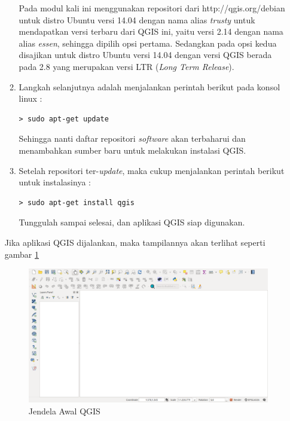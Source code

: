 \begin{enumerate}[A.]
\begin{enumerate}[1.]
Pada modul kali ini menggunakan repositori dari http://qgis.org/debian untuk distro Ubuntu versi 14.04 dengan nama alias \textit{trusty} untuk mendapatkan versi terbaru dari QGIS ini, yaitu versi 2.14 dengan nama alias \textit{essen}, sehingga dipilih opsi pertama. Sedangkan pada opsi kedua disajikan untuk distro Ubuntu versi 14.04 dengan versi QGIS berada pada 2.8 yang merupakan versi LTR (\textit{Long Term Release}).

\item Langkah selanjutnya adalah menjalankan perintah berikut pada konsol linux :

\begin{verbatim}
> sudo apt-get update
\end{verbatim}

Sehingga nanti daftar repositori \textit{software} akan terbaharui dan menambahkan sumber baru untuk melakukan instalasi QGIS.

\item Setelah repositori ter-\textit{update}, maka cukup menjalankan perintah berikut untuk instalasinya :

\begin{verbatim}
> sudo apt-get install qgis
\end{verbatim}

Tunggulah sampai selesai, dan aplikasi QGIS siap digunakan. 
\end{enumerate}

Jika aplikasi QGIS dijalankan, maka tampilannya akan terlihat seperti gambar \ref{fig:tampilan-awal-qgis}

\begin{figure}
  \centering
  \includegraphics[width=1\textwidth]{./resources/003-jendela-awal-qgis}
  \caption{Jendela Awal QGIS}
  \label{fig:tampilan-awal-qgis}
\end{figure}

\end{enumerate}
